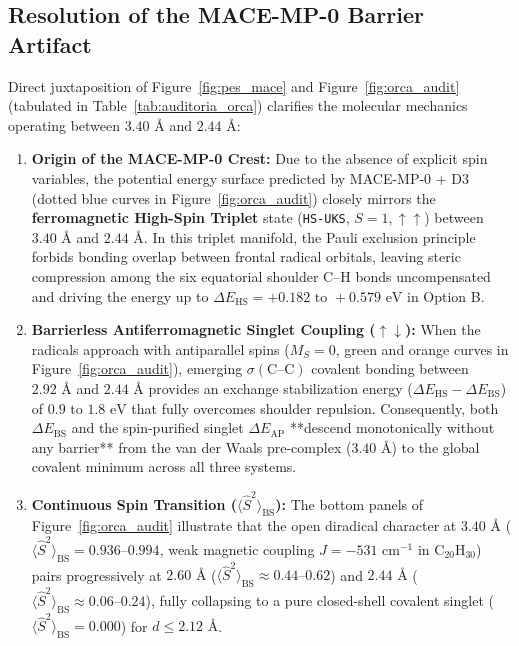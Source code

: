 \documentclass[10pt,twocolumn,a4paper]{article}
\begin{document}
\subsection{Resolution of the MACE-MP-0 Barrier Artifact}
Direct juxtaposition of Figure~\ref{fig:pes_mace} and Figure~\ref{fig:orca_audit} (tabulated in Table~\ref{tab:auditoria_orca}) clarifies the molecular mechanics operating between $3.40\text{ \AA}$ and $2.44\text{ \AA}$:
\begin{enumerate}
    \item \textbf{Origin of the MACE-MP-0 Crest:} Due to the absence of explicit spin variables, the potential energy surface predicted by MACE-MP-0 + D3 (dotted blue curves in Figure~\ref{fig:orca_audit}) closely mirrors the \textbf{ferromagnetic High-Spin Triplet} state (\texttt{HS-UKS}, $S=1, \uparrow\uparrow$) between $3.40\text{ \AA}$ and $2.44\text{ \AA}$. In this triplet manifold, the Pauli exclusion principle forbids bonding overlap between frontal radical orbitals, leaving steric compression among the six equatorial shoulder C--H bonds uncompensated and driving the energy up to $\Delta E_{\text{HS}} = +0.182\text{ to }+0.579\text{ eV}$ in Option B.
    \item \textbf{Barrierless Antiferromagnetic Singlet Coupling ($\uparrow\downarrow$):} When the radicals approach with antiparallel spins ($M_S=0$, green and orange curves in Figure~\ref{fig:orca_audit}), emerging $\sigma(\text{C--C})$ covalent bonding between $2.92\text{ \AA}$ and $2.44\text{ \AA}$ provides an exchange stabilization energy ($\Delta E_{\text{HS}} - \Delta E_{\text{BS}}$) of $0.9\text{ to }1.8\text{ eV}$ that fully overcomes shoulder repulsion. Consequently, both $\Delta E_{\text{BS}}$ and the spin-purified singlet $\Delta E_{\text{AP}}$ **descend monotonically without any barrier** from the van der Waals pre-complex ($3.40\text{ \AA}$) to the global covalent minimum across all three systems.
    \item \textbf{Continuous Spin Transition ($\langle \hat{S}^2 \rangle_{\text{BS}}$):} The bottom panels of Figure~\ref{fig:orca_audit} illustrate that the open diradical character at $3.40\text{ \AA}$ ($\langle \hat{S}^2 \rangle_{\text{BS}} = 0.936\text{--}0.994$, weak magnetic coupling $J = -531\text{ cm}^{-1}$ in $\text{C}_{20}\text{H}_{30}$) pairs progressively at $2.60\text{ \AA}$ ($\langle \hat{S}^2 \rangle_{\text{BS}} \approx 0.44\text{--}0.62$) and $2.44\text{ \AA}$ ($\langle \hat{S}^2 \rangle_{\text{BS}} \approx 0.06\text{--}0.24$), fully collapsing to a pure closed-shell covalent singlet ($\langle \hat{S}^2 \rangle_{\text{BS}} = 0.000$) for $d \le 2.12\text{ \AA}$.
\end{enumerate}
\end{document}
